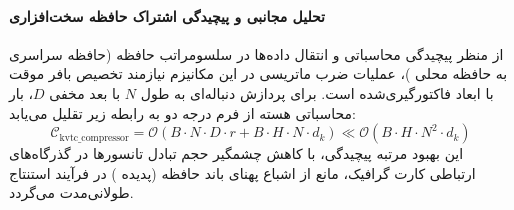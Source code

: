 \paragraph{تحلیل مجانبی و پیچیدگی اشتراک حافظه سخت‌افزاری}
از منظر پیچیدگی محاسباتی و انتقال داده‌ها در سلسومراتب حافظه (حافظه سراسری  به حافظه محلی )، عملیات ضرب ماتریسی در این مکانیزم نیازمند تخصیص بافر موقت با ابعاد فاکتورگیری‌شده است. برای پردازش دنباله‌ای به طول $N$ با بعد مخفی $D$، بار محاسباتی هسته از فرم درجه دو به رابطه زیر تقلیل می‌یابد:
\begin{equation}
\label{eq:complexity_kvtc_compressor}
\mathcal{C}_{\text{kvtc\_compressor}} = \mathcal{O}\left( B \cdot N \cdot D \cdot r + B \cdot H \cdot N \cdot d_k \right) \ll \mathcal{O}\left( B \cdot H \cdot N^2 \cdot d_k \right)
\end{equation}
این بهبود مرتبه پیچیدگی، با کاهش چشمگیر حجم تبادل تانسورها در گذرگاه‌های ارتباطی کارت گرافیک، مانع از اشباع پهنای باند حافظه (پدیده ) در فرآیند استنتاج طولانی‌مدت می‌گردد.
